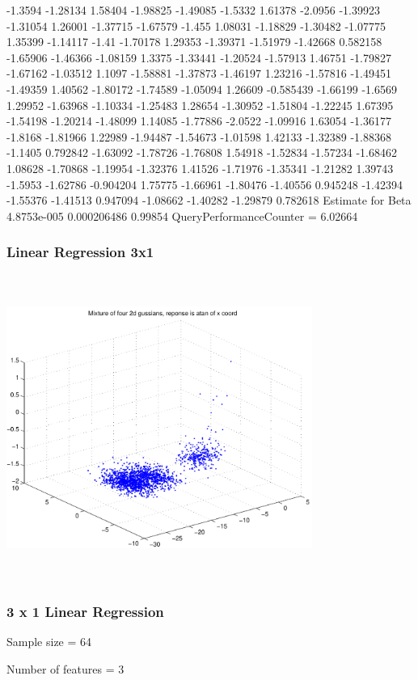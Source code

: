 \documentclass[9pt]{article}
\theoremstyle{plain}
\theoremstyle{definition}
\theoremstyle{remark}
\numberwithin{equation}{section}
\begin{document}
-1.3594
-1.28134
1.58404
-1.98825
-1.49085
-1.5332
1.61378
-2.0956
-1.39923
-1.31054
1.26001
-1.37715
-1.67579
-1.455
1.08031
-1.18829
-1.30482
-1.07775
1.35399
-1.14117
-1.41
-1.70178
1.29353
-1.39371
-1.51979
-1.42668
0.582158
-1.65906
-1.46366
-1.08159
1.3375
-1.33441
-1.20524
-1.57913
1.46751
-1.79827
-1.67162
-1.03512
1.1097
-1.58881
-1.37873
-1.46197
1.23216
-1.57816
-1.49451
-1.49359
1.40562
-1.80172
-1.74589
-1.05094
1.26609
-0.585439
-1.66199
-1.6569
1.29952
-1.63968
-1.10334
-1.25483
1.28654
-1.30952
-1.51804
-1.22245
1.67395
-1.54198
-1.20214
-1.48099
1.14085
-1.77886
-2.0522
-1.09916
1.63054
-1.36177
-1.8168
-1.81966
1.22989
-1.94487
-1.54673
-1.01598
1.42133
-1.32389
-1.88368
-1.1405
0.792842
-1.63092
-1.78726
-1.76808
1.54918
-1.52834
-1.57234
-1.68462
1.08628
-1.70868
-1.19954
-1.32376
1.41526
-1.71976
-1.35341
-1.21282
1.39743
-1.5953
-1.62786
-0.904204
1.75775
-1.66961
-1.80476
-1.40556
0.945248
-1.42394
-1.55376
-1.41513
0.947094
-1.08662
-1.40282
-1.29879
0.782618
Estimate for Beta
4.8753e-005
0.000206486
0.99854
QueryPerformanceCounter  =  6.02664
\subsubsection{Linear Regression 3x1}
\includegraphics[width=10.0cm,height=10.0cm]{AtanDataSet.pdf}

\subsubsection{3 x 1 Linear Regression}
Sample size = 64

Number of features = 3
\end{document}

